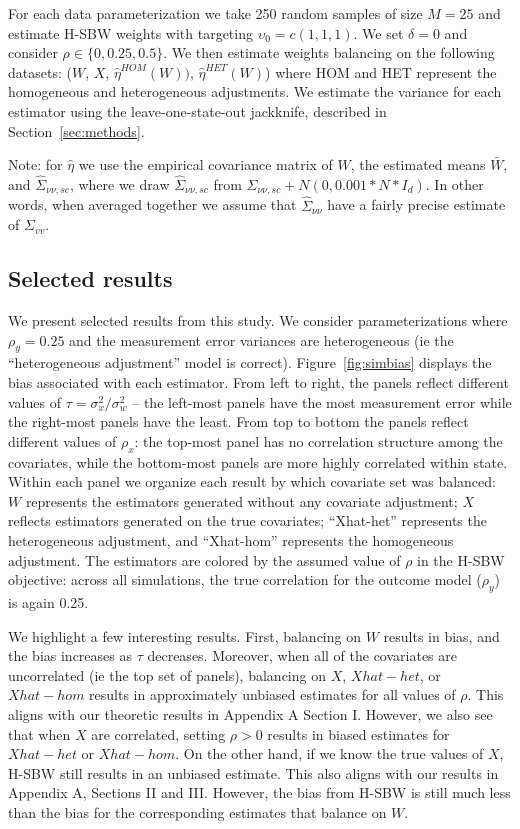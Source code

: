 For each data parameterization we take 250 random samples of size $M = 25$ and estimate H-SBW weights with targeting $\upsilon_0 = c(1, 1, 1)$. We set $\delta = 0$ and consider $\rho \in \{0, 0.25, 0.5\}$. We then estimate weights balancing on the following datasets: ($W$, $X$, $\hat{\eta}^{HOM}(W))$, $\hat{\eta}^{HET}(W)$) where HOM and HET represent the homogeneous and heterogeneous adjustments. We estimate the variance for each estimator using the leave-one-state-out jackknife, described in Section~\ref{sec:methods}. 
 
Note: for $\hat{\eta}$ we use the empirical covariance matrix of $W$, the estimated means $\bar{W}$, and $\hat{\Sigma}_{\nu\nu, sc}$, where we draw $\hat{\Sigma}_{\nu\nu, sc}$ from $\Sigma_{\nu\nu, sc} + N(0, 0.001*N*I_d)$. In other words, when averaged together we assume that $\hat{\Sigma}_{\nu\nu}$ have a fairly precise estimate of $\Sigma_{vv}$.

\subsection{Selected results}

We present selected results from this study. We consider parameterizations where $\rho_y = 0.25$ and the measurement error variances are heterogeneous (ie the ``heterogeneous adjustment'' model is correct). Figure~\ref{fig:simbias} displays the bias associated with each estimator. From left to right, the panels reflect different values of $\tau = \sigma^2_x/\sigma^2_w$ -- the left-most panels have the most measurement error while the right-most panels have the least. From top to bottom the panels reflect different values of $\rho_x$: the top-most panel has no correlation structure among the covariates, while the bottom-most panels are more highly correlated within state. Within each panel we organize each result by which covariate set was balanced: $W$ represents the estimators generated without any covariate adjustment; $X$ reflects estimators generated on the true covariates; ``Xhat-het'' represents the heterogeneous adjustment, and ``Xhat-hom'' represents the homogeneous adjustment. The estimators are colored by the assumed value of $\rho$ in the H-SBW objective: across all simulations, the true correlation for the outcome model ($\rho_y$) is again 0.25.

We highlight a few interesting results. First, balancing on $W$ results in bias, and the bias increases as $\tau$ decreases. Moreover, when all of the covariates are uncorrelated (ie the top set of panels), balancing on $X$, $Xhat-het$, or $Xhat-hom$ results in approximately unbiased estimates for all values of $\rho$. This aligns with our theoretic results in Appendix A Section I. However, we also see that when $X$ are correlated, setting $\rho > 0$ results in biased estimates for $Xhat-het$ or $Xhat-hom$. On the other hand, if we know the true values of $X$, H-SBW still results in an unbiased estimate. This also aligns with our results in Appendix A, Sections II and III. However, the bias from H-SBW is still much less than the bias for the corresponding estimates that balance on $W$. 

